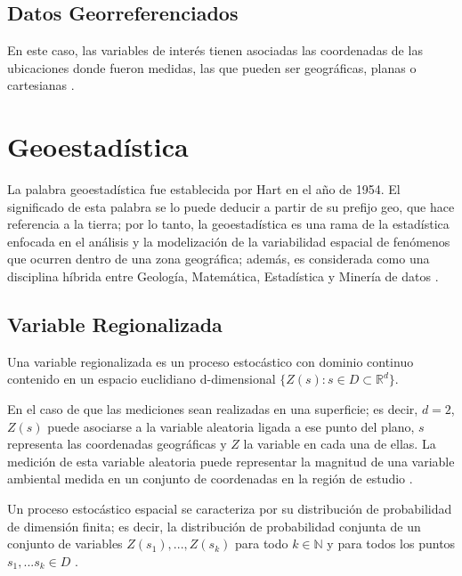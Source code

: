 \documentclass[
]{book}
\begin{document}
\hypertarget{datos-georreferenciados}{%
\subsection{Datos Georreferenciados}\label{datos-georreferenciados}}

En este caso, las variables de interés tienen asociadas las coordenadas de las ubicaciones donde fueron medidas, las que pueden ser geográficas, planas o cartesianas \citep{Ramon}.

\hypertarget{geoestaduxedstica-1}{%
\section{Geoestadística}\label{geoestaduxedstica-1}}

La palabra geoestadística fue establecida por Hart en el año de 1954. El significado de esta palabra se lo puede deducir a partir de su prefijo geo, que hace referencia a la tierra; por lo tanto, la geoestadística es una rama de la estadística enfocada en el análisis y la modelización de la variabilidad espacial de fenómenos que ocurren dentro de una zona geográfica; además, es considerada como una disciplina híbrida entre Geología, Matemática, Estadística y Minería de datos \citep{Cressi}.

\hypertarget{variable-regionalizada}{%
\subsection{Variable Regionalizada}\label{variable-regionalizada}}

Una variable regionalizada es un proceso estocástico con dominio continuo contenido en un espacio euclidiano d-dimensional \(\{Z(s):s\in D\subset \mathbb{R}^d\}\).

En el caso de que las mediciones sean realizadas en una superficie; es decir, \(d=2\), \(Z(s)\) puede asociarse a la variable aleatoria ligada a ese punto del plano, \(s\) representa las coordenadas geográficas y \(Z\) la variable en cada una de ellas. La medición de esta variable aleatoria puede representar la magnitud de una variable ambiental medida en un conjunto de coordenadas en la región de estudio \citep{Ramon}.

Un proceso estocástico espacial se caracteriza por su distribución de probabilidad de dimensión finita; es decir, la distribución de probabilidad conjunta de un conjunto de variables \(Z(s_1),...,Z(s_k)\) para todo \(k \in \mathbb{N}\) y para todos los puntos \(s_1,...s_k \in D\) \citep{marta}.
\end{document}
